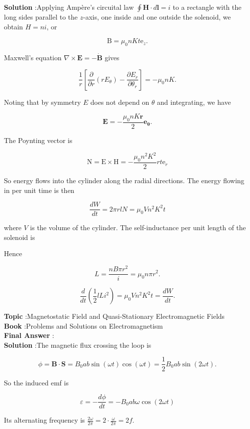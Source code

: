\documentclass[10pt]{article}
\begin{document}
\textbf{Solution} :Applying Ampère's circuital law $\oint \mathbf{H} \cdot d \mathbf{l}=i$ to a rectangle with the long sides parallel to the $z$-axis, one inside and one outside the solenoid, we obtain $H=n i$, or

$$
\mathrm{B}=\mu_{0} n K t \mathrm{e}_{z} .
$$

 Maxwell's equation $\nabla \times \mathbf{E}=-\dot{\mathbf{B}}$ gives

$$
\frac{1}{r}\left[\frac{\partial}{\partial r}\left(r E_{\theta}\right)-\frac{\partial E_{r}}{\partial \theta_{r}}\right]=-\mu_{0} n K .
$$

Noting that by symmetry $E$ does not depend on $\theta$ and integrating, we have

$$
\mathbf{E}=-\frac{\mu_{0} n K \boldsymbol{r}}{2} \mathbf{e}_{\boldsymbol{\theta}} .
$$



 The Poynting vector is

$$
\mathrm{N}=\mathrm{E} \times \mathrm{H}=-\frac{\mu_{0} n^{2} K^{2}}{2} r t \mathrm{e}_{r}
$$

So energy flows into the cylinder along the radial directions. The energy flowing in per unit time is then

$$
\frac{d W}{d t}=2 \pi r l N=\mu_{0} V n^{2} K^{2} t
$$

where $V$ is the volume of the cylinder. The self-inductance per unit length of the solenoid is

Hence

$$
L=\frac{n B \pi r^{2}}{i}=\mu_{0} n \pi r^{2} .
$$

$$
\frac{d}{d t}\left(\frac{1}{2} l L i^{2}\right)=\mu_{0} V n^{2} K^{2} t=\frac{d W}{d t} .
$$

\textbf{Topic} :Magnetostatic Field and Quasi-Stationary Electromagnetic Fields\\
\textbf{Book} :Problems and Solutions on Electromagnetism\\
\textbf{Final Answer} :\\


\textbf{Solution} :The magnetic flux crossing the loop is

$$
\phi=\mathbf{B} \cdot \mathbf{S}=B_{0} a b \sin (\omega t) \cos (\omega t)=\frac{1}{2} B_{0} a b \sin (2 \omega t) .
$$

So the induced emf is

$$
\varepsilon=-\frac{d \phi}{d t}=-B_{0} a b \omega \cos (2 \omega t)
$$

Its alternating frequency is $\frac{2 \omega}{2 \pi}=2 \cdot \frac{\omega}{2 \pi}=2 f$.
\end{document}
